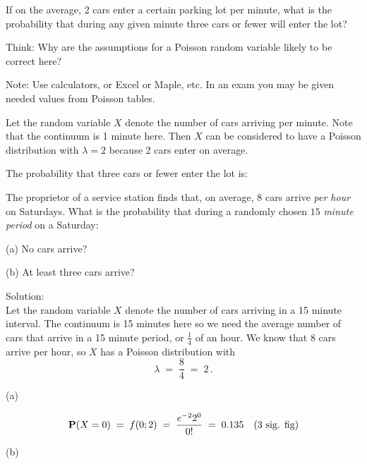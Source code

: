 \begin{example}{\label{eqn:poi_cars}}
If on the average, 2 cars enter a certain parking lot per minute,
  what is the probability that during any given minute three cars or
  fewer
  will enter the lot?

Think: Why are the assumptions for a Poisson random variable likely to
be correct here?

Note: Use calculators, or Excel or Maple, etc. In an exam you may be given needed values from Poisson tables.


Let the random variable $X$ denote the number of cars
  arriving per minute. Note that the continuum is 1 minute here. Then  $X$ can be considered to have  a Poisson distribution
  with $\lambda=2$ because 2 cars enter on
average.

\medskip

The probability that three cars or fewer enter the lot is:
\end{example}


\begin{example}\label{Eg:serviceStation}
The proprietor of a service station finds that, on average, $8$
  cars arrive \emph{per hour} on Saturdays. What is the probability
  that during a randomly chosen $15$ \emph{minute period} on a Saturday:
\be
\item[(a)] No cars arrive?
\item[(b)]  At least three cars arrive?
\ee

Solution:\\[4pt]
Let the random variable $X$ denote the number of cars
  arriving in a 15 minute interval. The continuum is 15 minutes here so
  we need the average number of cars that arrive in a 15 minute
  period, or $\frac{1}{4}$ of an hour.  We know that 8 cars arrive per
  hour, so  $X$ has a Poisson distribution
  with
\[\lambda \;=\; \frac{8}{4}\;=\; 2\,.\]

\be
\item[(a)]

\[\mathbf{P}(X=0)\;=\;  f(0; 2)\;=\;  \frac{ e^{-2} 2^0}{0!}\;=\; 0.135 \quad (\text{3 sig. fig})\]

\item[(b)]
\ee
\end{example}

